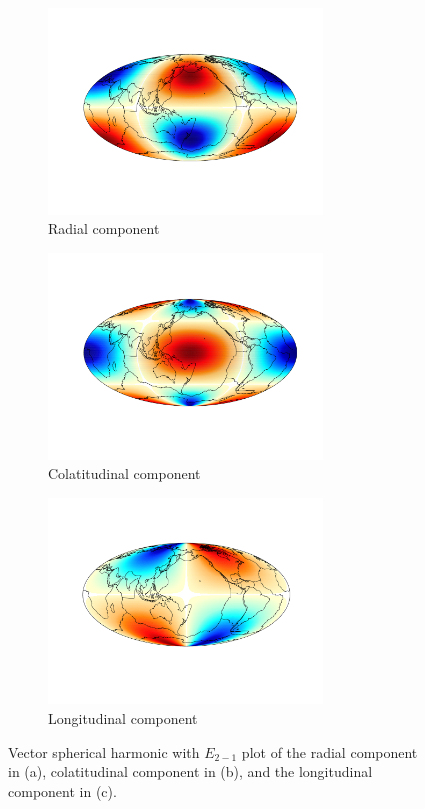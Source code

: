 \documentclass[11pt]{article}
\begin{document}
\begin{figure}[H]
  \begin{subfigure}{.5\textwidth}
  \centering
  \includegraphics[width=0.8\textwidth]{figures_Rep2/E2m1_rad.png}
  \caption{Radial component}
  \label{rad}
  \end{subfigure}
  \begin{subfigure}{.5\textwidth}
  \centering
  \includegraphics[width=0.8\textwidth]{figures_Rep2/E2m1_theta.png}
  \caption{Colatitudinal component}
  \end{subfigure}
  \begin{subfigure}{.5\textwidth}
  \centering
  \includegraphics[width=0.8\textwidth]{figures_Rep2/E2m1_phi.png}  
  \caption{Longitudinal component}
  \end{subfigure}
  \caption{Vector spherical harmonic with $E_{2-1}$ plot of the radial component in (a), colatitudinal component in (b), and the longitudinal component in (c).}
\label{E6}
\end{figure}
\end{document}
